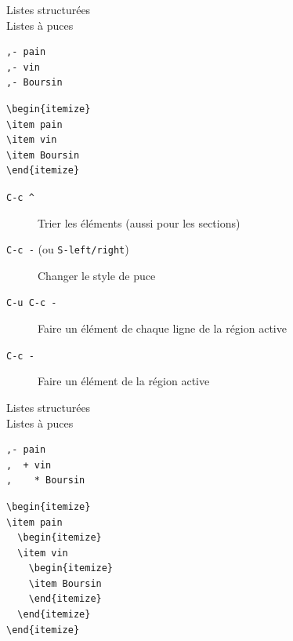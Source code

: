 \documentclass[presentation,t,hideothersubsections]{beamer}
\begin{document}
\begin{frame}[fragile,label=sec-2-6-1]{Listes structurées \\ Listes à puces}
 \lstset{language=org,numbers=none}
\begin{lstlisting}
,- pain
,- vin
,- Boursin
\end{lstlisting}

\lstset{language=TeX,numbers=none}
\begin{lstlisting}
\begin{itemize}
\item pain
\item vin
\item Boursin
\end{itemize}
\end{lstlisting}

\begin{description}
\item[\texttt{C-c \textasciicircum{}}] Trier les \alert{éléments} (aussi pour les \alert{sections})
\item[\texttt{C-c -} (ou \texttt{S-left/right})] Changer le style de puce

\item[\texttt{C-u C-c -}] Faire un élément de chaque ligne de la région active
\item[\texttt{C-c -}] Faire un élément de la région active
\end{description}
\end{frame}
\begin{frame}[fragile,label=sec-2-6-2]{Listes structurées \\ Listes à puces}
 \lstset{language=org,numbers=none}
\begin{lstlisting}
,- pain
,  + vin
,    * Boursin
\end{lstlisting}

\lstset{language=TeX,numbers=none}
\begin{lstlisting}
\begin{itemize}
\item pain
  \begin{itemize}
  \item vin
    \begin{itemize}
    \item Boursin
    \end{itemize}
  \end{itemize}
\end{itemize}
\end{lstlisting}
\end{frame}
\end{document}
